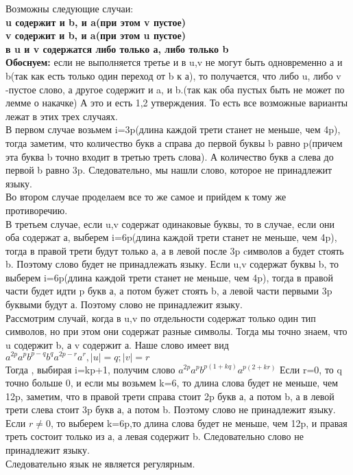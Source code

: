 \documentclass[a4paper,12pt]{article}
\begin{document}
Возможны следующие случаи:\\
\textbf{u содержит и b, и a(при этом v пустое)}\\
\textbf{v содержит и b, и a(при этом u пустое)}\\
\textbf{в u и v содержатся либо только а, либо только b}\\
\textbf{Обоснуем:} если не выполняется третье и в u,v не могут быть одновременно а и b(так как есть только один переход от b к а),  то получается, что либо u, либо v -пустое слово, а другое содержит и a, и b.(так как оба пустых быть не может по лемме о накачке) А это и есть 1,2 утверждения. То есть все возможные варианты лежат в этих трех случаях.\\
В первом случае возьмем i=3p(длина каждой трети станет не меньше, чем 4p), тогда заметим, что количество букв а справа до первой буквы b равно p(причем эта буква b точно входит в третью треть слова). А количество букв а слева до первой b равно 3p. Следовательно, мы нашли слово, которое не принадлежит языку.\\
Во втором случае проделаем все то же самое и прийдем к тому же противоречию.\\
В третьем случае, если u,v содержат одинаковые буквы, то в случае, если они оба содержат а, выберем i=6p(длина каждой трети станет не меньше, чем 4p), тогда в правой трети будут только а, а в левой после 3p cимволов а будет стоять b. Поэтому слово будет не принадлежать языку. Если u,v содержат буквы b, то выберем i=6p(длина каждой трети станет не меньше, чем 4p), тогда в правой части будет идти p букв а, а потом бужет стоять b, а левой части первыми 3p буквыми будут а. Поэтому слово не принадлежит языку.\\
Рассмотрим случай, когда в u,v по отдельности содержат только один тип символов, но при этом они содержат разные символы. Тогда мы точно знаем, что u содержит  b, а v содержит а. Наше слово имеет вид $a^{2p}a^pb^{p-q}b^qa^{2p-r}a^r,|u|=q;|v|=r$\\
Тогда , выбирая i=kp+1, получим слово $a^{2p}a^pb^{p(1+kq)}a^{p(2+kr)}$
Если r=0, то q точно больше 0, и если мы возьмем k=6, то длина слова будет не меньше, чем 12p, заметим, что в правой трети справа стоит 2p букв а, а потом b, а в левой трети слева стоит 3p букв а, а потом b. Поэтому слово не принадлежит языку.\\
Если $r\neq0$, то выберем k=6p,то длина слова будет не меньше, чем 12p, и правая треть состоит только из а, а левая содержит b. Следовательно слово не принадлежит языку.\\
Следовательно язык не является регулярным.\\
\end{document}
